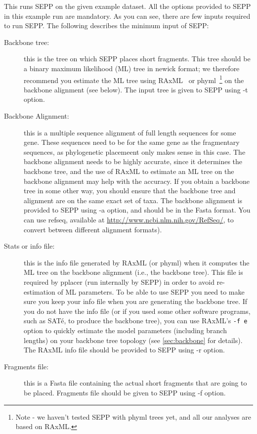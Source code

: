 \documentclass[11pt]{article} %
\newcommand{\sepp}{SEPP\xspace}
\newcommand{\ins}[1]{{\tt #1}}
\newcommand{\sate}{SAT\'{e}\xspace}
\newcommand{\raxml}{RAxML\xspace}
\begin{document}
This runs \sepp on the given example dataset. All the options provided to \sepp in this example run are mandatory. As you can see, there are few inputs required to run \sepp. The following describes the minimum input of \sepp:
\begin {description}
\item[Backbone tree:] this is the tree on which \sepp places short fragments. 
This tree should be a binary maximum likelihood (ML) tree
in newick format; we therefore recommend you estimate
the ML tree  using \raxml~\cite{raxml} or phyml~\cite{phyml}\footnote{Note - we 
haven't tested \sepp with phyml trees yet, and all our analyses are
based on RAxML.}  on the backbone alignment (see below). The 
input tree is given to \sepp using -t option.
\item[Backbone Alignment:] this is a multiple sequence alignment 
of full length sequences for some gene. These sequences need to
be for the same gene as the fragmentary sequences, as phylogenetic
placemeent only makes sense in this case.  The backbone 
alignment needs to be highly accurate, since it determines the backbone
tree, and the use of RAxML to estimate an ML tree on the
backbone alignment may help with the accuracy.  If you obtain a
backbone tree in some other way, you should ensure that the
backbone tree and alignment  are on the same exact set of taxa.
The backbone alignment is provided to \sepp using -a option, and should be in 
the Fasta format. You can use  refseq, available  at 
\url{http://www.ncbi.nlm.nih.gov/RefSeq/}, to convert  between different alignment formats). 
\item[Stats or info file:] this is the info file generated by RAxML (or phyml) 
when it computes the ML tree on the backbone alignment (i.e., the
backbone tree). 
This file is required by  pplacer (run internally by \sepp) 
in order to avoid re-estimation of ML parameters. 
To be able to use \sepp you need to make sure you keep your 
info file when you are generating the backbone tree. 
If you do not have the info file (or if you used 
some other software programs, such as \sate, to produce the
backbone tree), you can use RAxML's \ins{-f e} option to quickly 
estimate the model parameters (including branch lengths) on your 
backbone tree topology (see \ref{sec:backbone} for details). 
The RAxML info file should be provided to \sepp using -r option. 
\item[Fragments file:] this is a Fasta file containing the actual short fragments that are going to be placed. Fragments file should be given to \sepp using -f option. 
\end{description}
\end{document}
